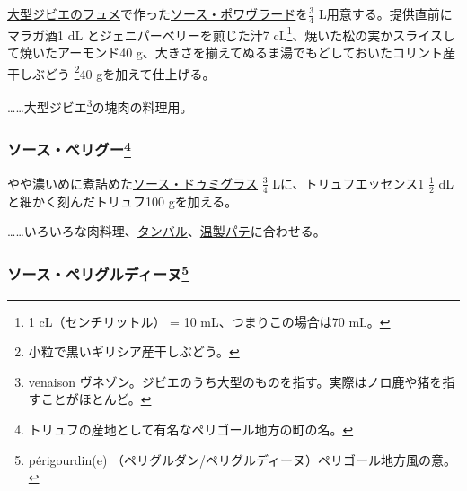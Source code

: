 \begin{recette}

 

\protect\hyperlink{fonds-de-gibier}{大型ジビエのフュメ}で作った\protect\hyperlink{sauce-poivrade}{ソース・ポワヴラード}を\(\frac{3}{4}\)
L用意する。提供直前にマラガ酒1 dL とジェニパーベリーを煎じた汁7
cL\footnote{1 cL（センチリットル） = 10 mL、つまりこの場合は70 mL。}、焼いた松の実かスライスして焼いたアーモンド40
g、大きさを揃えてぬるま湯でもどしておいたコリント産干しぶどう \footnote{小粒で黒いギリシア産干しぶどう。}40
gを加えて仕上げる。

\ldots{}\ldots{}大型ジビエ\footnote{venaison
  ヴネゾン。ジビエのうち大型のものを指す。実際はノロ鹿や猪を指すことがほとんど。}の塊肉の料理用。

\atoaki{}

\hypertarget{sauce-perigueux}{%
\subsubsection[ソース・ペリグー]{\texorpdfstring{ソース・ペリグー\footnote{トリュフの産地として有名なペリゴール地方の町の名。}}{ソース・ペリグー}}\label{sauce-perigueux}}


 

やや濃いめに煮詰めた\protect\hyperlink{sauce-demi-glace}{ソース・ドゥミグラス}
\(\frac{3}{4}\) Lに、トリュフエッセンス1 \(\frac{1}{2}\)
dLと細かく刻んだトリュフ100 gを加える。

\ldots{}\ldots{}いろいろな肉料理、\protect\hyperlink{}{タンバル}、\protect\hyperlink{}{温製パテ}に合わせる。

\atoaki{}

\hypertarget{sauce-perigourdine}{%
\subsubsection[ソース・ペリグルディーヌ]{\texorpdfstring{ソース・ペリグルディーヌ\footnote{périgourdin(e)
  （ペリグルダン/ペリグルディーヌ）ペリゴール地方風の意。}}{ソース・ペリグルディーヌ}}\label{sauce-perigourdine}}


\end{recette}
